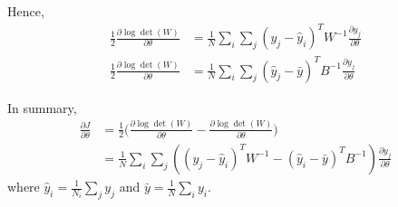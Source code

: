 \documentclass{article}
\begin{document}
Hence,
\begin{align}
\frac{1}{2}\frac{\partial \log\det(W)}{\partial \theta} &=  \frac{1}{N}\sum_i\sum_j(y_j-\hat{y}_i)^TW^{-1}\frac{\partial y_j}{\partial \theta} \\
\frac{1}{2}\frac{\partial \log\det(W)}{\partial \theta} &=  \frac{1}{N}\sum_i\sum_j(\hat{y}_j-\bar{y})^TB^{-1}\frac{\partial y_j}{\partial \theta}
\end{align}

In summary,
\begin{align}
\frac{\partial J}{\partial \theta} &= \frac{1}{2}\Bigg(\frac{\partial \log\det(W)}{\partial \theta} - \frac{\partial \log\det(W)}{\partial \theta}\Bigg) \\
 &= \frac{1}{N}\sum_i\sum_j((y_j - \hat{y}_i)^TW^{-1} - (\hat{y}_i - \bar{y})^TB^{-1})\frac{\partial y_j}{\partial \theta}
\end{align}
where $\hat{y}_i = \frac{1}{N_i}\sum_j y_j$ and $\bar{y} = \frac{1}{N}\sum_i y_i$.
\end{document}
